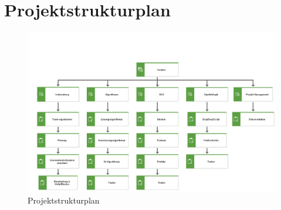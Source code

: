 \chapter{Projektstrukturplan}

\begin{figure}[!htbp]
  \centering
     \includegraphics[keepaspectratio=true,
     scale=0.525,angle={90}]{Graphics/Struktur.png}
  \caption{Projektstrukturplan}
  \label{fig:Struktur}
\end{figure}
